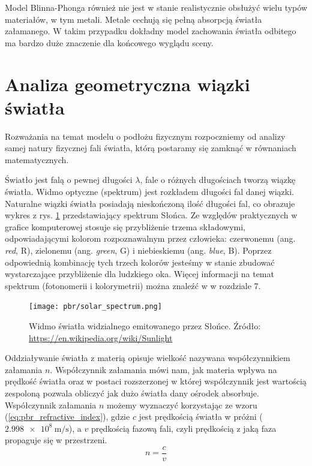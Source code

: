 \documentclass[../main.tex]{subfiles}
\begin{document}
Model Blinna-Phonga również nie jest w stanie realistycznie obsłużyć wielu typów materiałów, w tym metali. Metale cechują się pełną absorpcją światła załamanego. W takim przypadku dokładny model zachowania światła odbitego ma bardzo duże znaczenie dla końcowego wyglądu sceny.

\section{Analiza geometryczna wiązki światła}

Rozważania na temat modelu o podłożu fizycznym rozpoczniemy od analizy samej natury fizycznej fali światła, którą postaramy się zamknąć w równaniach matematycznych. 

Światło jest falą o pewnej długości $\lambda$, fale o różnych długościach tworzą wiązkę światła. Widmo optyczne (spektrum) jest rozkładem długości fal danej wiązki. Naturalne wiązki światła posiadają nieskończoną ilość długości fal, co obrazuje wykres z rys. \ref{fig:solar_spectrum} przedstawiający spektrum Słońca. Ze względów praktycznych w grafice komputerowej stosuje się przybliżenie trzema składowymi, odpowiadającymi kolorom rozpoznawalnym przez człowieka: czerwonemu (ang. \textit{red}, R), zielonemu (ang. \textit{green}, G) i niebieskiemu (ang. \textit{blue}, B). Poprzez odpowiednią kombinację tych trzech kolorów jesteśmy w stanie zbudować wystarczające przybliżenie dla ludzkiego oka. Więcej informacji na temat spektrum (fotonomerii i kolorymetrii) można znaleźć w \cite{RealTimeRendering2008} w rozdziale 7.

\begin{figure}[ht]
  \centering
  \texttt{[image: pbr/solar\_spectrum.png]}
  \caption{Widmo światła widzialnego emitowanego przez Słońce. Źródło: \url{https://en.wikipedia.org/wiki/Sunlight}}
  \label{fig:solar_spectrum}
\end{figure}

Oddziaływanie światła z materią opisuje wielkość nazywana współczynnikiem załamania $n$. Współczynnik załamania mówi nam, jak materia wpływa na prędkość światła oraz w postaci rozszerzonej w której współczynnik jest wartością zespoloną pozwala obliczyć jak dużo światła dany ośrodek absorbuje. Współczynnik załamania $n$ możemy wyznaczyć korzystając ze wzoru (\ref{eq:pbr_refractive_index}), gdzie $c$ jest prędkością światła w próżni ($\SI{2.998e8}{\meter\per\second}$), a $v$ prędkością fazową fali, czyli prędkością z jaką faza propaguje się w przestrzeni.
\begin{equation}
    n = \frac{c}{v}
\label{eq:pbr_refractive_index}
\end{equation}
\end{document}
